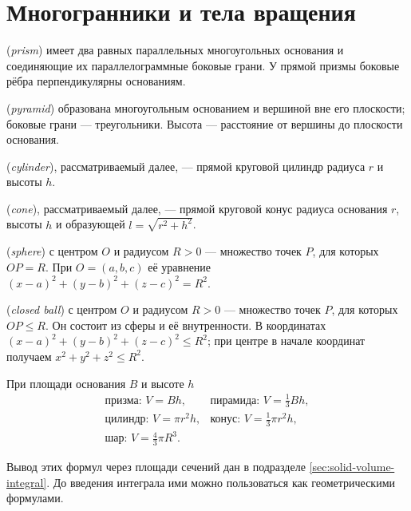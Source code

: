 \section{Многогранники и тела вращения}
\begin{definition} (\emph{prism}) имеет два равных параллельных многоугольных основания и соединяющие их параллелограммные боковые грани. У прямой призмы боковые рёбра перпендикулярны основаниям.\end{definition}
\begin{definition} (\emph{pyramid}) образована многоугольным основанием и вершиной вне его плоскости; боковые грани — треугольники. Высота — расстояние от вершины до плоскости основания.\end{definition}
\begin{definition} (\emph{cylinder}), рассматриваемый далее, — прямой круговой цилиндр радиуса \(r\) и высоты \(h\).\end{definition}
\begin{definition} (\emph{cone}), рассматриваемый далее, — прямой круговой конус радиуса основания \(r\), высоты \(h\) и образующей \(l=\sqrt{r^2+h^2}\).\end{definition}
\begin{definition} (\emph{sphere}) с центром \(O\) и радиусом \(R>0\) — множество точек \(P\), для которых \(OP=R\). При \(O=(a,b,c)\) её уравнение \((x-a)^2+(y-b)^2+(z-c)^2=R^2\).\end{definition}
\begin{definition} (\emph{closed ball}) с центром \(O\) и радиусом \(R>0\) — множество точек \(P\), для которых \(OP\le R\). Он состоит из сферы и её внутренности. В координатах \((x-a)^2+(y-b)^2+(z-c)^2\le R^2\); при центре в начале координат получаем \(x^2+y^2+z^2\le R^2\).\end{definition}
\begin{theorem}\label{thm:solid-volumes}
При площади основания \(B\) и высоте \(h\)
\[
\begin{array}{ll}
\text{призма: }V=Bh,&\text{пирамида: }V=\frac13Bh,\\
\text{цилиндр: }V=\pi r^2h,&\text{конус: }V=\frac13\pi r^2h,\\
\text{шар: }V=\frac43\pi R^3.&
\end{array}
\]
\end{theorem}
Вывод этих формул через площади сечений дан в подразделе \ref{sec:solid-volume-integral}. До введения интеграла ими можно пользоваться как геометрическими формулами.

